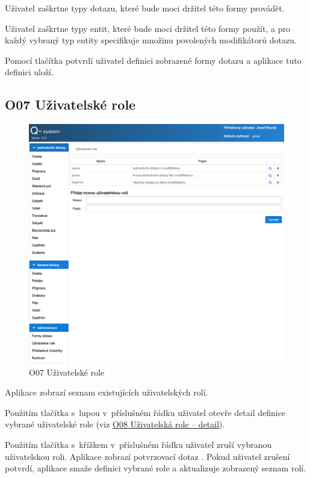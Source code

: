 \documentclass[thesis=M,czech]{FITthesis}[2019/12/23]
\begin{document}
Uživatel zaškrtne typy dotazu, které bude moci držitel této formy provádět.

Uživatel zaškrtne typy entit, které bude moci držitel této formy použít, a pro každý vybraný typ entity specifikuje množinu povolených modifikátorů dotazu.

Pomocí tlačítka  potvrdí uživatel definici zobrazené formy dotazu a aplikace tuto definici uloží.

\subsection{O07 Uživatelské role}
\label{O07UzivatelskeRole}
\begin{figure}[H]
  \centering
  \includegraphics[width=\textwidth]{res/screens/O07 Uživatelské role.png}
  \caption{O07 Uživatelské role}
  \label{fig:O07 Uživatelské role}
\end{figure}

Aplikace zobrazí seznam existujících uživatelských rolí.

Použitím tlačítka s~lupou v~příslušném řádku uživatel otevře detail definice vybrané uživatelské role (viz \hyperref[O08UzivatelskaRoleDetail]{O08 Uživatelská role – detail}).

Použitím tlačítka s~křížkem v~příslušném řádku uživatel zruší vybranou uživatelskou roli. Aplikace zobrazí potvrzovací dotaz . Pokud uživatel zrušení potvrdí, aplikace smaže definici vybrané role a aktualizuje zobrazený seznam rolí.
\end{document}

